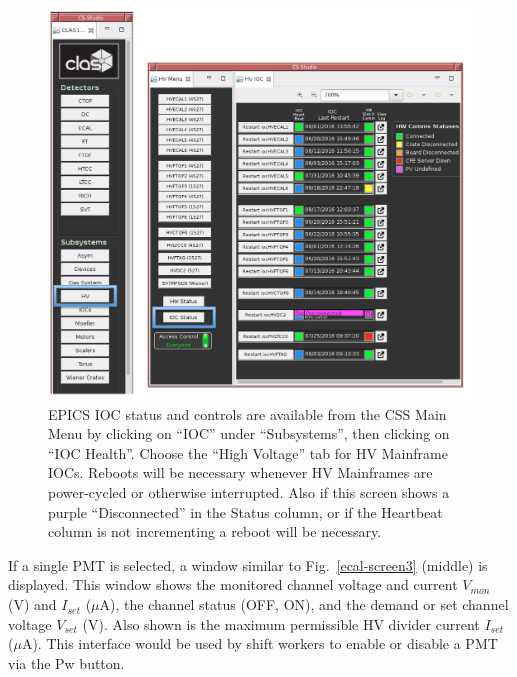 \documentclass[letterpaper,10pt]{article}
\begin{document}
\begin{figure}[htbp]
  \centering
  \includegraphics[width= 6in, keepaspectratio = true]{HV_IOC_2}
  \vspace{2mm}
  \caption{EPICS IOC status and controls are available from the CSS Main Menu by clicking on ``IOC'' under ``Subsystems'',
    then clicking on ``IOC Health''.  Choose the ``High Voltage'' tab for HV Mainframe IOCs.  Reboots will be necessary whenever HV Mainframes are power-cycled or otherwise
  interrupted.  Also if this screen shows a purple ``Disconnected'' in the Status column, or if the Heartbeat column is not incrementing a reboot will be necessary.}
  \label{ecal-screen4}
\end{figure}

\vfil
\eject

If a single PMT is selected, a window similar to Fig.~\ref{ecal-screen3} (middle) is displayed. This
window shows the monitored channel voltage and current $V_{mon}$ (V) and $I_{set}$ ($\mu$A), the channel status (OFF, ON),
and the demand or set channel voltage $V_{set}$ (V).  Also shown is the maximum permissible HV divider
current $I_{set}$ ($\mu$A).  This interface would be used by shift workers to enable or disable a
PMT via the Pw button.
\end{document}
